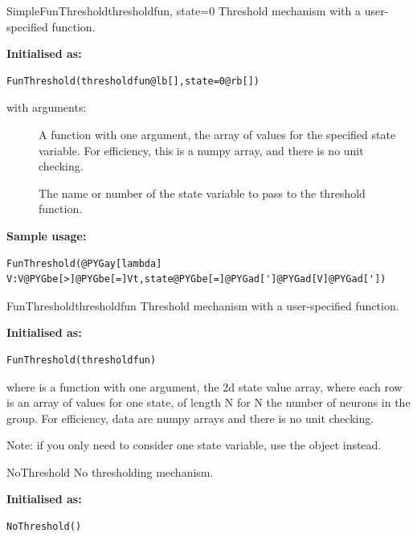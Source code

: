 \documentclass[letterpaper,10pt]{manual}
\begin{document}
\hypertarget{brian.SimpleFunThreshold}{}\begin{classdesc}{SimpleFunThreshold}{thresholdfun, state=0}
Threshold mechanism with a user-specified function.

\textbf{Initialised as:}

\begin{Verbatim}[commandchars=@\[\]]
FunThreshold(thresholdfun@lb[],state=0@rb[])
\end{Verbatim}

with arguments:
\begin{description}
\item[]
A function with one argument, the array of values for
the specified state variable. For efficiency, this is
a numpy array, and there is no unit checking.

\item[]
The name or number of the state variable to pass to
the threshold function.

\end{description}

\textbf{Sample usage:}

\begin{Verbatim}[commandchars=@\[\]]
FunThreshold(@PYGay[lambda] V:V@PYGbe[>]@PYGbe[=]Vt,state@PYGbe[=]@PYGad[']@PYGad[V]@PYGad['])
\end{Verbatim}
\end{classdesc}


\hypertarget{brian.FunThreshold}{}\begin{classdesc}{FunThreshold}{thresholdfun}
Threshold mechanism with a user-specified function.

\textbf{Initialised as:}

\begin{Verbatim}[commandchars=@\[\]]
FunThreshold(thresholdfun)
\end{Verbatim}

where  is a function with one argument,
the 2d state value array, where each row is an array of
values for one state, of length N for N the number of
neurons in the group. For efficiency, data are numpy
arrays and there is no unit checking.

Note: if you only need to consider one state variable,
use the \hyperlink{brian.SimpleFunThreshold}{} object instead.
\end{classdesc}


\hypertarget{brian.NoThreshold}{}\begin{classdesc}{NoThreshold}{}
No thresholding mechanism.

\textbf{Initialised as:}

\begin{Verbatim}[commandchars=@\[\]]
NoThreshold()
\end{Verbatim}
\end{classdesc}
\end{document}
